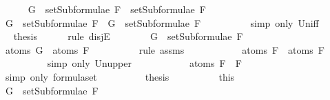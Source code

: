 \begin{isabellebody}
\isanewline
\ \ \ \ \isamarkupfalse%
\ {\isachardoublequoteopen}G\ {\isasymin}\ setSubformulae\ F{}\ {\isasymunion}\ setSubformulae\ F{}{\isachardoublequoteclose}\isanewline
\ \ \ \ \isamarkupfalse%
\ \isamarkupfalse%
\ {\isachardoublequoteopen}G\ {\isasymin}\ setSubformulae\ F{}\ {\isasymor}\ G\ {\isasymin}\ setSubformulae\ F{}{\isachardoublequoteclose}\ \ \isanewline
\ \ \ \ \ \ \isamarkupfalse%
\ {\isacharparenleft}simp\ only{\isacharcolon}\ Un{\isacharunderscore}iff{\isacharparenright}\isanewline
\ \ \ \ \isamarkupfalse%
\ \isamarkupfalse%
\ {\isacharquery}thesis\isanewline
\ \ \ \ \isamarkupfalse%
\ {\isacharparenleft}rule\ disjE{\isacharparenright}\isanewline
\ \ \ \ \ \ \isamarkupfalse%
\ {\isachardoublequoteopen}G\ {\isasymin}\ setSubformulae\ F{}{\isachardoublequoteclose}\isanewline
\ \ \ \ \ \ \isamarkupfalse%
\ \isamarkupfalse%
\ {\isachardoublequoteopen}atoms\ G\ {\isasymsubseteq}\ atoms\ F{}{\isachardoublequoteclose}\isanewline
\ \ \ \ \ \ \ \ \isamarkupfalse%
\ {\isacharparenleft}rule\ assms{\isacharparenleft}{}{\isacharparenright}{\isacharparenright}\isanewline
\ \ \ \ \ \ \isamarkupfalse%
\ \isamarkupfalse%
\ {\isachardoublequoteopen}{\isasymdots}\ {\isasymsubseteq}\ atoms\ F{}\ {\isasymunion}\ atoms\ F{}{\isachardoublequoteclose}\isanewline
\ \ \ \ \ \ \ \ \isamarkupfalse%
\ {\isacharparenleft}simp\ only{\isacharcolon}\ Un{\isacharunderscore}upper{}{\isacharparenright}\isanewline
\ \ \ \ \ \ \isamarkupfalse%
\ \isamarkupfalse%
\ {\isachardoublequoteopen}{\isasymdots}\ {\isacharequal}\ atoms\ {\isacharparenleft}F{}\ \isactrlbold {\isasymrightarrow}\ F{}{\isacharparenright}{\isachardoublequoteclose}\isanewline
\ \ \ \ \ \ \ \ \isamarkupfalse%
\ {\isacharparenleft}simp\ only{\isacharcolon}\ formula{\isachardot}set{\isacharparenleft}{}{\isacharparenright}{\isacharparenright}\isanewline
\ \ \ \ \ \ \isamarkupfalse%
\ \isamarkupfalse%
\ {\isacharquery}thesis\isanewline
\ \ \ \ \ \ \ \ \isamarkupfalse%
\ this\isanewline
\ \ \ \ \isamarkupfalse%
\isanewline
\ \ \ \ \ \ \isamarkupfalse%
\ {\isachardoublequoteopen}G\ {\isasymin}\ setSubformulae\ F{}{\isachardoublequoteclose}\isanewline

\end{isabellebody}
